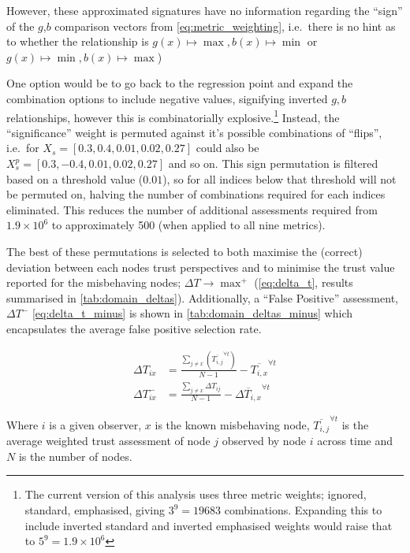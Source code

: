 However, these approximated signatures have no information regarding the ``sign'' of the  $g$,$b$ comparison vectors from \eqref{eq:metric_weighting}, i.e.\ there is no hint as to whether the relationship is $g(x) \mapsto \max, b(x) \mapsto \min$ or $g(x) \mapsto \min, b(x) \mapsto \max$)  

One option would be to go back to the regression point and expand the combination options to include negative values, signifying inverted $g,b$ relationships, however this is combinatorially explosive.\footnote{The current version of this analysis uses three metric weights; ignored, standard, emphasised, giving $3^9 = 19683$ combinations. Expanding this to include inverted standard and inverted emphasised weights would raise that to $5^9 = 1.9\times 10^6$}
Instead, the ``significance'' weight is permuted against it's possible combinations of ``flips'', i.e.\ for $X_s=[0.3,0.4,0.01,0.02,0.27]$ could also be $X_s^p=[0.3,-0.4,0.01,0.02,0.27]$ and so on. 
This sign permutation is filtered based on a threshold value ($0.01$), so for all indices below that threshold will not be permuted on, halving the number of combinations required for each indices eliminated.
This reduces the number of additional assessments required from $1.9\times 10^6$ to approximately 500 (when applied to all nine metrics).

The best of these permutations is selected to both maximise the (correct) deviation between each nodes trust perspectives and to minimise the trust value reported for the misbehaving nodes; $\Delta T \to \max^+$ (\autoref{eq:delta_t}, results summarised in \autoref{tab:domain_deltas}).
Additionally, a ``False Positive'' assessment, $\Delta T^-$ \autoref{eq:delta_t_minus} is shown in \autoref{tab:domain_deltas_minus} which encapsulates the average false positive selection rate.

\begin{align}
  \Delta T_{ix} &= \frac{\sum_{j\neq x}\left( \overline{T_{i,j}}^{\forall t}\right)}{N-1} - \overline{T_{i,x}}^{\forall t} \label{eq:delta_t}\\
  \Delta T_{ix}^- &= \frac{\sum_{j\neq x} \Delta T_{ij}}{N-1} - \overline{\Delta T_{i,x}}^{\forall t} \label{eq:delta_t_minus} 
\end{align}

Where $i$ is a given observer, $x$ is the known misbehaving node, $\overline{T_{i,j}}^{\forall t}$ is the average weighted trust assessment of node $j$ observed by node $i$ across time and $N$ is the number of nodes.

